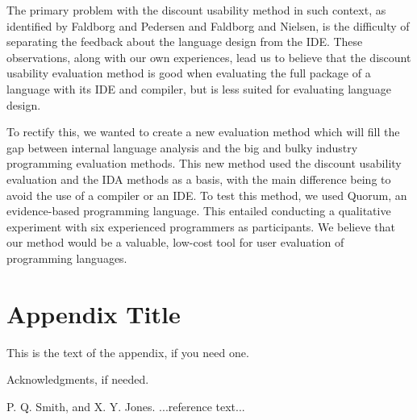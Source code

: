 \documentclass[preprint,10pt]{sigplanconf}
\begin{document}
The primary problem with the discount usability method in such context, as identified by Faldborg and Pedersen and Faldborg and Nielsen, is the difficulty of separating the feedback about the language design from the IDE.
These observations, along with our own experiences, lead us to believe that the discount usability evaluation method is good when evaluating the full package of a language with its IDE and compiler, but is less suited for evaluating language design.

To rectify this, we wanted to create a new evaluation method which will fill the gap between 
internal language analysis and the big and bulky industry programming evaluation methods\cite{AliceCS1}\cite{BlockOrNot}\cite{FromScratch}. This new method used the discount usability evaluation and the IDA methods as a basis, with the main difference being to avoid the use of a compiler or an IDE. To test this method, we used Quorum, an evidence-based programming language. This entailed conducting a qualitative experiment with six experienced programmers as participants.
We believe that our method would be a valuable, low-cost tool for user evaluation of programming languages. 

\appendix
\section{Appendix Title}

This is the text of the appendix, if you need one.

\acks

Acknowledgments, if needed.





\begin{thebibliography}{}
\softraggedright

P. Q. Smith, and X. Y. Jones. ...reference text...

\end{thebibliography}
\end{document}
